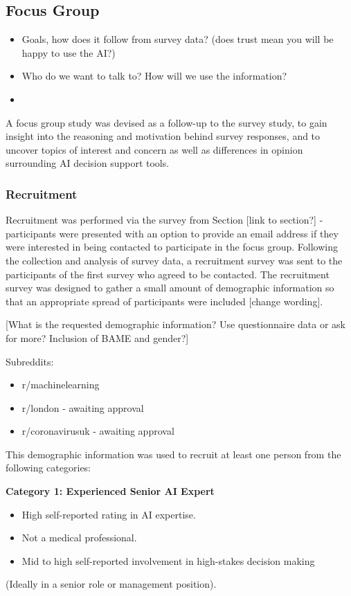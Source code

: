 \documentclass[manuscript,screen,review]{acmart}
\begin{document}
\subsection{Focus Group}
\begin{itemize}
    \item Goals, how does it follow from survey data? (does trust mean you will be happy to use the AI?)
    \item Who do we want to talk to? How will we use the information?
    \item 
\end{itemize}

A focus group study was devised as a follow-up to the survey study, to gain insight into the reasoning and motivation behind survey responses, and to uncover topics of interest and concern as well as differences in opinion surrounding AI decision support tools.  



\subsubsection{Recruitment}

Recruitment was performed via the survey from Section [link to section?] - participants were presented with an option to provide an email address if they were interested in being contacted to participate in the focus group. Following the collection and analysis of survey data, a recruitment survey was sent to the participants of the first survey who agreed to be contacted. The recruitment survey was designed to gather a small amount of demographic information so that an appropriate spread of participants were included [change wording].

[What is the requested demographic information? Use questionnaire data or ask for more? Inclusion of BAME and gender?]

Subreddits:
\begin{itemize}
    \item r/machinelearning
    \item r/london - awaiting approval
    \item r/coronavirusuk - awaiting approval
\end{itemize}

This demographic information was used to recruit at least one person from the following categories:

\textbf{Category 1: Experienced Senior AI Expert}
\begin{itemize}
\item High self-reported rating in AI expertise.
\item Not a medical professional.
\item Mid to high self-reported involvement in high-stakes decision making
\end{itemize}
(Ideally in a senior role or management position).
\end{document}
